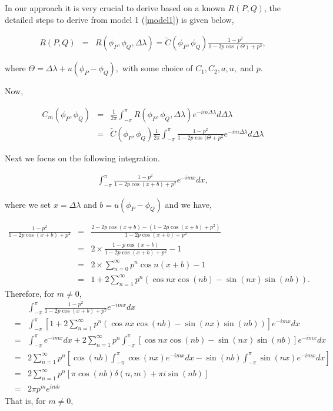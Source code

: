 
%
%

In our approach it is very crucial to derive \Cm based on a known $R(P,Q)$, the detailed steps to derive \Cm from model 1 (\ref{model1}) is given below,


\begin{eqnarray*}
	R(P, Q) &=& R(\phi_P, \phi_Q, \Delta \lambda) = \tilde{C}(\phi_P, \phi_Q) \frac{1-p^2}{1 - 2p \cos(\Theta)+p^2},
\end{eqnarray*}

where $\Theta = \Delta \lambda + u(\phi_P - \phi_Q),$ with some choice of $C_1, C_2, a, u,$ and $p$.

Now,

\begin{eqnarray*}
	C_m(\phi_P, \phi_Q) &=& \frac{1}{2\pi} \int_{-\pi}^\pi R(\phi_P, \phi_Q, \Delta \lambda) e^{-im\Delta \lambda}d\Delta \lambda \\
	&=& \tilde{C}(\phi_P, \phi_Q) \frac{1}{2\pi}\int_{-\pi}^\pi \frac{1-p^2}{1 - 2p \cos(\Theta+p^2} e^{-im\Delta \lambda}d\Delta \lambda
\end{eqnarray*}

Next we focus on the following integration.

\begin{eqnarray*}
	\int_{-\pi}^\pi \frac{1-p^2}{1 - 2p \cos(x+b)+p^2} e^{-imx}dx ,
\end{eqnarray*}

where we set $x=\Delta\lambda$ and $b=u(\phi_P -\phi_Q)$ and we have,

\begin{eqnarray*}
	\frac{1-p^2}{1 - 2p \cos(x+b)+p^2} &=& \frac{2-2p\cos(x+b)-(1-2p \cos(x+b)+p^2)}{1-2p \cos(x+b)+p^2}\\
	&=& 2\times \frac{1-p\cos(x+b)}{1-2p \cos(x+b)+p^2}-1 \\
	&=& 2\times \sum_{n=0}^{\infty}p^n\cos n(x+b)-1  \\
	&=& 1 + 2 \sum_{n=1}^{\infty}p^n (\cos nx \cos(nb) - \sin(nx) \sin(nb)).
\end{eqnarray*}
Therefore, for $m \ne 0$,
\begin{eqnarray*}
	& & \int_{-\pi}^\pi \frac{1-p^2}{1 - 2p \cos(x+b)+p^2} e^{-imx}dx \\
	&=& \int_{-\pi}^\pi \left[1 + 2 \sum_{n=1}^{\infty}p^n (\cos nx \cos(nb) - \sin(nx) \sin(nb))\right]  e^{-imx}dx \\
	&=& \int_{-\pi}^\pi e^{-imx}dx + 2 \sum_{n=1}^{\infty}p^n \int_{-\pi}^\pi \left[\cos nx \cos(nb) - \sin(nx) \sin(nb)\right]  e^{-imx}dx \\
	&=& 2 \sum_{n=1}^{\infty}p^n \left[\cos(nb)  \int_{-\pi}^\pi \cos(nx) e^{-imx} dx - \sin(nb)  \int_{-\pi}^\pi \sin(nx) e^{-imx}dx \right] \\
	&=& 2 \sum_{n=1}^{\infty}p^n \left[ \pi \cos(nb) \delta(n, m) + \pi i\sin(nb)\right] \\
	&=& 2\pi p^m e^{imb}
\end{eqnarray*}
That is, for $m \ne 0$,

